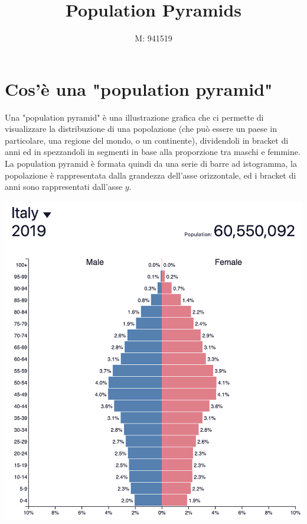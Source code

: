 \documentclass[11pt, oneside]{article}   	%
\title{Population Pyramids}
\author{M: 941519}
\begin{document}
\maketitle


\tableofcontents
\pagebreak
\section{Cos'è una "population pyramid"}
Una "population pyramid" è una illustrazione grafica che ci permette di visualizzare la distribuzione di una popolazione (che può essere un paese in particolare, una regione del mondo, o un continente), dividendoli in bracket di anni ed in spezzandoli in segmenti in base alla proporzione tra maschi e femmine.\\

La population pyramid è formata quindi da una serie di barre ad istogramma, la popolazione è rappresentata dalla grandezza dell'asse orizzontale, ed i bracket di anni sono rappresentati dall'asse $y$.


\begin{center}
\includegraphics[scale=0.6]{pop}
\end{center}
\end{document}
